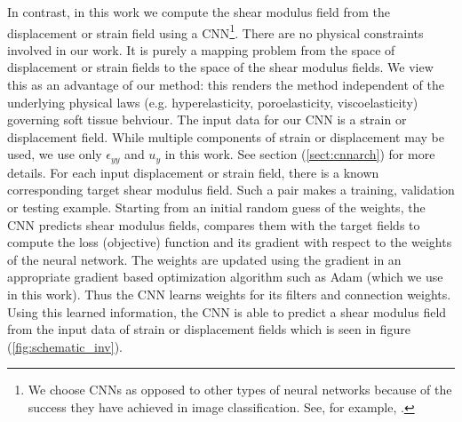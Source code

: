\documentclass[12pt]{article}
\begin{document}
In contrast, in this work we compute the shear modulus field from the displacement or strain field using a CNN\footnote{We choose CNNs as opposed to other types of neural networks because of the success they have achieved in image classification. See, for example, \cite{paper:hinton2017}.}. There are no physical constraints involved in our work. It is purely a mapping problem from the space of displacement or strain fields to the space of the shear modulus fields. We view this as an advantage of our method: this renders the method independent of the underlying physical laws (e.g. hyperelasticity, poroelasticity, viscoelasticity) governing soft tissue behviour. The input data for our CNN is a strain or displacement field. While multiple components of strain or displacement may be used, we use only $\epsilon_{yy}$ and $u_y$ in this work. See section (\ref{sect:cnnarch}) for more details. For each input displacement or strain field, there is a known corresponding target shear modulus field. Such a pair makes a training, validation or testing example. Starting from an initial random guess of the weights, the CNN predicts shear modulus fields, compares them with the target fields to compute the loss (objective) function and its gradient with respect to the weights of the neural network. The weights are updated using the gradient in an appropriate gradient based optimization algorithm such as Adam \cite{misc:kingma2017adam} (which we use in this work). Thus the CNN learns weights for its filters and connection weights. Using this learned information, the CNN is able to predict a shear modulus field from the input data of strain or displacement fields which is seen in figure (\ref{fig:schematic_inv}).
\end{document}
